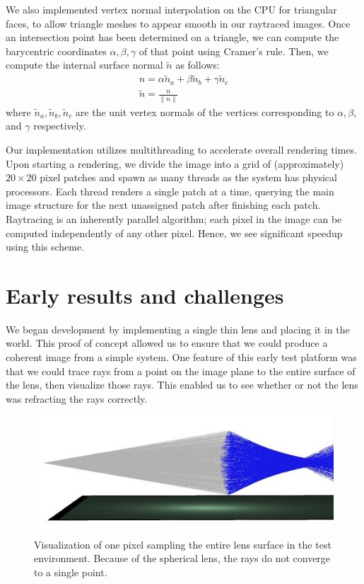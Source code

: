 \documentclass[twocolumn]{article}
\begin{document}
We also implemented vertex normal interpolation on the CPU for triangular
faces, to allow triangle meshes to appear smooth in our raytraced images. Once
an intersection point has been determined on a triangle, we can compute the
barycentric coordinates $\alpha, \beta, \gamma$ of that point using Cramer's
rule. Then, we compute the internal surface normal $\tilde{n}$ as follows:
\begin{gather*}
  n = \alpha\tilde{n}_a + \beta\tilde{n}_b + \gamma\tilde{n}_c \\
  \tilde{n} = \frac{n}{\|n\|}
\end{gather*}
where $\tilde{n}_a, \tilde{n}_b, \tilde{n}_c$ are the unit vertex normals of the
vertices corresponding to $\alpha, \beta$, and $\gamma$ respectively.

Our implementation utilizes multithreading to accelerate overall rendering times.
Upon starting a rendering, we divide the image into a grid of (approximately)
$20\times 20$ pixel patches and spawn as many threads as the system has physical
processors. Each thread renders a single patch at a time, querying the main
image structure for the next unassigned patch after finishing each patch.
Raytracing is an inherently parallel algorithm; each pixel in the image can be
computed independently of any other pixel. Hence, we see significant speedup using
this scheme.

\section{Early results and challenges}
We began development by implementing a single thin lens and placing it in the world.
This proof of concept allowed us to ensure that we could produce a coherent image
from a simple system. One feature of this early test platform was that we could
trace rays from a point on the image plane to the entire surface of the lens, then
visualize those rays. This enabled us to see whether or not the lens was refracting
the rays correctly.

\begin{figure}[h]
    \centering
    \includegraphics[scale=0.45]{img/lotsa_rays.jpg}
    \caption{Visualization of one pixel sampling the entire lens surface in the test
    environment. Because of the spherical lens, the rays do not converge to a single
    point.}
    \label{fig:lotsa_rays}
\end{figure}
\end{document}
